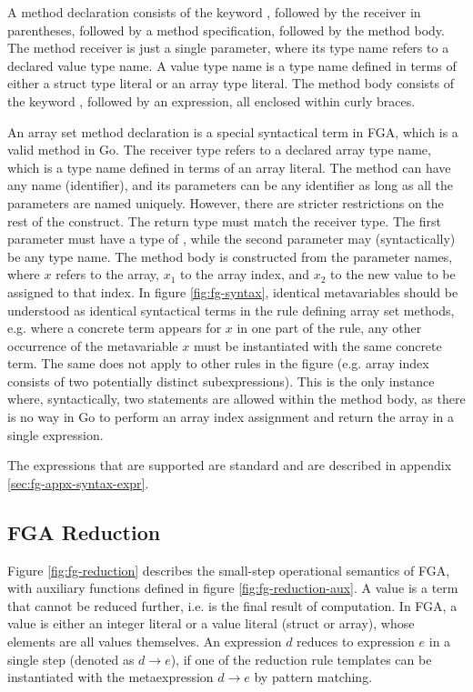 A method declaration consists of the keyword \func, followed by the receiver in
parentheses, followed by a method specification, followed by the method body.
The method receiver is just a single parameter, where its type name refers to a
declared value type name. A value type name is a type name defined in terms of
either a struct type literal or an array type literal. The method body consists
of the keyword \return, followed by an expression, all enclosed within curly
braces.

An array set method declaration is a special syntactical term in FGA, which is a
valid method in Go. The receiver type refers to a declared array type name,
which is a type name defined in terms of an array literal. The method can have
any name (identifier), and its parameters can be any identifier as long as all
the parameters are named uniquely. However, there are stricter restrictions on
the rest of the construct. The return type must match the receiver type. The
first parameter must have a type of , while the second parameter may
(syntactically) be any type name. The method body is constructed from the
parameter names, where $x$ refers to the array, $x_1$ to the array index, and
$x_2$ to the new value to be assigned to that index. In figure
\ref{fig:fg-syntax}, identical metavariables should be understood as identical
syntactical terms in the rule defining array set methods, e.g. where a concrete
term appears for $x$ in one part of the rule, any other occurrence of the
metavariable $x$ must be instantiated with the same concrete term. The same does
not apply to other rules in the figure (e.g. array index consists of two
potentially distinct subexpressions). This is the only instance where,
syntactically, two statements are allowed within the method body, as there is no
way in Go to perform an array index assignment and return the array in a single
expression.

The expressions that are supported are standard and are described in
appendix \ref{sec:fg-appx-syntax-expr}.



\subsection{FGA Reduction}

Figure \ref{fig:fg-reduction} describes the small-step operational semantics of
FGA, with auxiliary functions defined in figure \ref{fig:fg-reduction-aux}. A
value is a term that cannot be reduced further, i.e. is the final result of
computation. In FGA, a value is either an integer literal or a value literal
(struct or array), whose elements are all values themselves. An expression $d$
reduces to expression $e$ in a single step (denoted as $d \to e$), if one of the
reduction rule templates can be instantiated with the metaexpression $d \to e$
by pattern matching.

